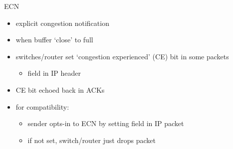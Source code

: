 \begin{frame}{ECN}
\begin{itemize}
\item explicit congestion notification
\vspace{.5cm}
\item when buffer `close' to full
\item switches/router set `congestion experienced' (CE) bit in some packets
    \begin{itemize}
    \item field in IP header
    \end{itemize}
\item CE bit echoed back in ACKs
\vspace{.5cm}
\item for compatibility:
    \begin{itemize}
    \item sender opts-in to ECN by setting field in IP packet
    \item if not set, switch/router just drops packet
    \end{itemize}
\end{itemize}
\end{frame}


